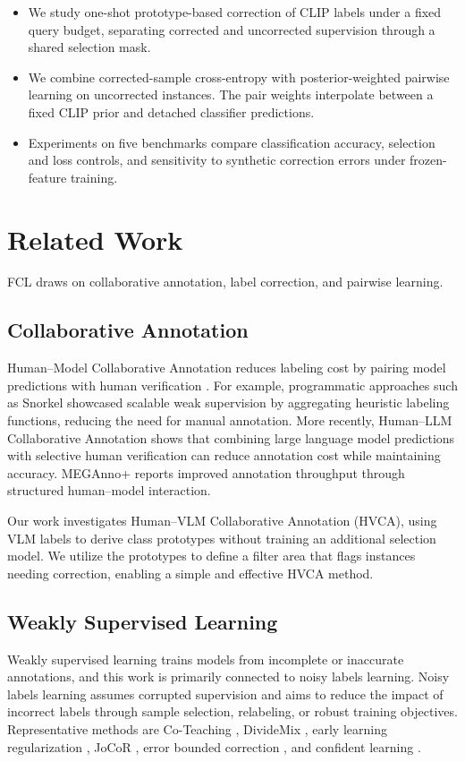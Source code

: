\documentclass[10pt,twocolumn,letterpaper]{article}
\begin{document}
\begin{itemize}
    \item We study one-shot prototype-based correction of CLIP labels under a fixed query budget, separating corrected and uncorrected supervision through a shared selection mask.
    \item We combine corrected-sample cross-entropy with posterior-weighted pairwise learning on uncorrected instances. The pair weights interpolate between a fixed CLIP prior and detached classifier predictions.
    \item Experiments on five benchmarks compare classification accuracy, selection and loss controls, and sensitivity to synthetic correction errors under frozen-feature training.
\end{itemize}

\section{Related Work}
FCL draws on collaborative annotation, label correction, and pairwise learning.
\subsection{Collaborative Annotation}
Human–Model Collaborative Annotation reduces labeling cost by pairing model predictions with human verification \cite{papadopoulos2017extreme, maninis2018dextr, acuna2018polyrnnpp}. For example, programmatic approaches such as Snorkel \cite{ratner2016dataprog, ratner2017snorkel} showcased scalable weak supervision by aggregating heuristic labeling functions, reducing the need for manual annotation. More recently, Human–LLM Collaborative Annotation \cite{wang2024humanllm} shows that combining large language model predictions with selective human verification can reduce annotation cost while maintaining accuracy. MEGAnno+ \cite{kim2024meganno} reports improved annotation throughput through structured human–model interaction.

Our work investigates Human--VLM Collaborative Annotation (HVCA), using VLM labels to derive class prototypes without training an additional selection model. We utilize the prototypes to define a filter area that flags instances needing correction, enabling a simple and effective HVCA method.

\subsection{Weakly Supervised Learning}
Weakly supervised learning trains models from incomplete or inaccurate annotations, and this work is  primarily connected to noisy labels learning. Noisy labels learning assumes corrupted supervision and aims to reduce the impact of incorrect labels through sample selection, relabeling, or robust training objectives. Representative methods are Co-Teaching \cite{han2018coteaching}, DivideMix \cite{li2020dividemix}, early learning regularization \cite{liu2020elr}, JoCoR \cite{wei2020jocor}, error bounded correction \cite{zheng2020ebc, song2023noisysurvey}, and confident learning \cite{northcutt2021cl}.
\end{document}
